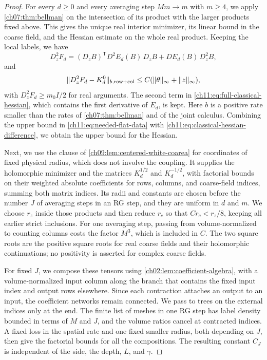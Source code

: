\begin{proof}
For every $d\ge0$ and every averaging step $Mm\to m$ with $m\ge4$, we apply \cref{ch07:thm:bellman} on the intersection of its product with the larger products fixed above. This gives the unique real interior minimizer, its linear bound in the coarse field, and the Hessian estimate on the whole real product. Keeping the local labels, we have
\begin{equation}\label{ch11:eq:full-classical-hessian}
 D_z^2F_d=(D_zB)^{\mathsf T}D^2E_d(B)\,D_zB+DE_d(B)\,D_z^2B,
\end{equation}
and
\begin{equation}\label{ch11:eq:classical-hessian-difference}
 \lVert D_z^2F_d-K_d^0\rVert_{b,\mathrm{row+col}}\le C(\lVert \theta\rVert_\infty+\lVert z\rVert_\infty),
\end{equation}
with $D_z^2F_d\ge m_0I/2$ for real arguments. The second term in \eqref{ch11:eq:full-classical-hessian}, which contains the first derivative of $E_d$, is kept. Here $b$ is a positive rate smaller than the rates of \cref{ch07:thm:bellman} and of the joint calculus. Combining the upper bound in \eqref{ch11:eq:needed-flat-data} with \eqref{ch11:eq:classical-hessian-difference}, we obtain the upper bound for the Hessian.

Next, we use the clause of \cref{ch09:lem:centered-white-coarea} for coordinates of fixed physical radius, which does not involve the coupling. It supplies the holomorphic minimizer and the matrices $K_d^{1/2}$ and $K_d^{-1/2}$, with factorial bounds on their weighted absolute coefficients for rows, columns, and coarse-field indices, summing both matrix indices. Its radii and constants are chosen before the number $J$ of averaging steps in an RG step, and they are uniform in $d$ and $m$. We choose $r_z$ inside those products and then reduce $r_c$ so that $Cr_c<r_z/8$, keeping all earlier strict inclusions. For one averaging step, passing from volume-normalized to counting columns costs the factor $M^3$, which is included in $C$. The two square roots are the positive square roots for real coarse fields and their holomorphic continuations; no positivity is asserted for complex coarse fields.

For fixed $J$, we compose these tensors using \cref{ch02:lem:coefficient-algebra}, with a volume-normalized input column along the branch that contains the fixed input index and output rows elsewhere. Since each contraction attaches an output to an input, the coefficient networks remain connected. We pass to trees on the external indices only at the end. The finite list of meshes in one RG step has label density bounded in terms of $M$ and $J$, and the volume ratios cancel at contracted indices. A fixed loss in the spatial rate and one fixed smaller radius, both depending on $J$, then give the factorial bounds for all the compositions. The resulting constant $C_J$ is independent of the side, the depth, $L$, and $\gamma$.
\end{proof}

